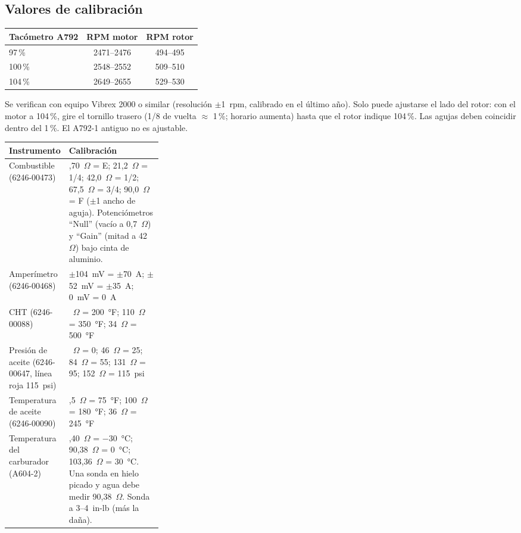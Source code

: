 \subsection{Valores de calibración}

\begin{center}
\small
\begin{tabular}{lcc}
\toprule
Tacómetro A792 & RPM motor & RPM rotor \\
\midrule
97\,\% & 2471--2476 & 494--495 \\
100\,\% & 2548--2552 & 509--510 \\
104\,\% & 2649--2655 & 529--530 \\
\bottomrule
\end{tabular}
\end{center}

Se verifican con equipo Vibrex 2000 o similar (resolución $\pm$1~rpm, calibrado en el último año). Solo puede ajustarse el lado del rotor: con el motor a 104\,\%, gire el tornillo trasero (1/8 de vuelta $\approx$ 1\,\%; horario aumenta) hasta que el rotor indique 104\,\%. Las agujas deben coincidir dentro del 1\,\%. El A792-1 antiguo no es ajustable.

\begin{center}
\small
\begin{tabularx}{\linewidth}{@{}>{\raggedright\arraybackslash}p{0.3\linewidth}>{\raggedright\arraybackslash}X@{}}
\toprule
Instrumento & Calibración \\
\midrule
Combustible (6246-00473) & 0,70~$\Omega$ = E; 21,2~$\Omega$ = 1/4; 42,0~$\Omega$ = 1/2; 67,5~$\Omega$ = 3/4; 90,0~$\Omega$ = F ($\pm$1 ancho de aguja). Potenciómetros ``Null'' (vacío a 0,7~$\Omega$) y ``Gain'' (mitad a 42~$\Omega$) bajo cinta de aluminio. \\
Amperímetro (6246-00468) & $\pm$104~mV = $\pm$70~A; $\pm$52~mV = $\pm$35~A; 0~mV = 0~A \\
CHT (6246-00088) & 745~$\Omega$ = 200~°F; 110~$\Omega$ = 350~°F; 34~$\Omega$ = 500~°F \\
Presión de aceite (6246-00647, línea roja 115~psi) & 9~$\Omega$ = 0; 46~$\Omega$ = 25; 84~$\Omega$ = 55; 131~$\Omega$ = 95; 152~$\Omega$ = 115~psi \\
Temperatura de aceite (6246-00090) & 903,5~$\Omega$ = 75~°F; 100~$\Omega$ = 180~°F; 36~$\Omega$ = 245~°F \\
Temperatura del carburador (A604-2) & 77,40~$\Omega$ = $-$30~°C; 90,38~$\Omega$ = 0~°C; 103,36~$\Omega$ = 30~°C. Una sonda en hielo picado y agua debe medir 90,38~$\Omega$. Sonda a 3--4~in-lb (más la daña). \\
\bottomrule
\end{tabularx}
\end{center}

